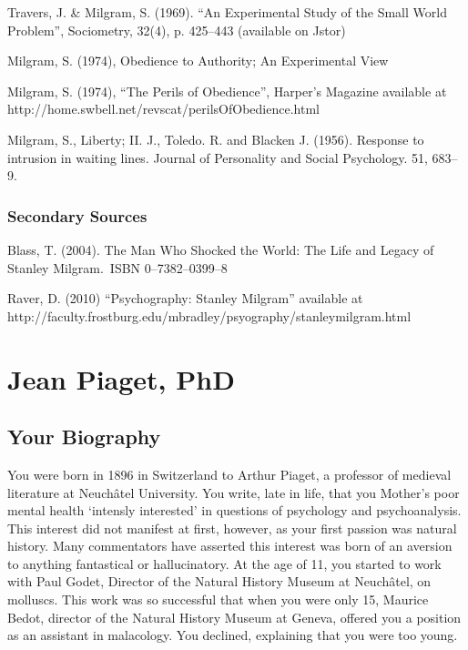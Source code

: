\begin{refsection}
Travers, J. \& Milgram, S. (1969). ``An Experimental Study of the Small World Problem'', Sociometry, 32(4), p. 425--443 (available on Jstor)

Milgram, S. (1974), Obedience to Authority; An Experimental View

Milgram, S. (1974), ``The Perils of Obedience'', Harper's Magazine available at http:\slash \slash home.swbell.net\slash revscat\slash perilsOfObedience.html

Milgram, S., Liberty; II. J., Toledo. R. and Blacken J. (1956). Response to intrusion in waiting lines. Journal of Personality and Social Psychology. 51, 683--9.

\subsection{Secondary Sources}
\label{secondarysources}

Blass, T. (2004). The Man Who Shocked the World: The Life and Legacy of Stanley Milgram. ISBN 0--7382--0399--8

Raver, D. (2010) ``Psychography: Stanley Milgram'' available at http:\slash \slash faculty.frostburg.edu\slash mbradley\slash psyography\slash stanleymilgram.html

\chapter{Jean Piaget, PhD}
\label{jeanpiagetphd}

\section{Your Biography}
\label{yourbiography}

You were born in 1896 in Switzerland to Arthur Piaget, a professor of medieval literature at Neuchâtel University. You write, late in life, that you Mother's poor mental health `intensly interested' in questions of psychology and psychoanalysis. This interest did not manifest at first, however, as your first passion was natural history. Many commentators have asserted this interest was born of an aversion to anything fantastical or hallucinatory. At the age of 11, you started to work with Paul Godet, Director of the Natural History Museum at Neuchâtel, on molluscs. This work was so successful that when you were only 15, Maurice Bedot, director of the Natural History Museum at Geneva, offered you a position as an assistant in malacology. You declined, explaining that you were too young.


\end{refsection}
